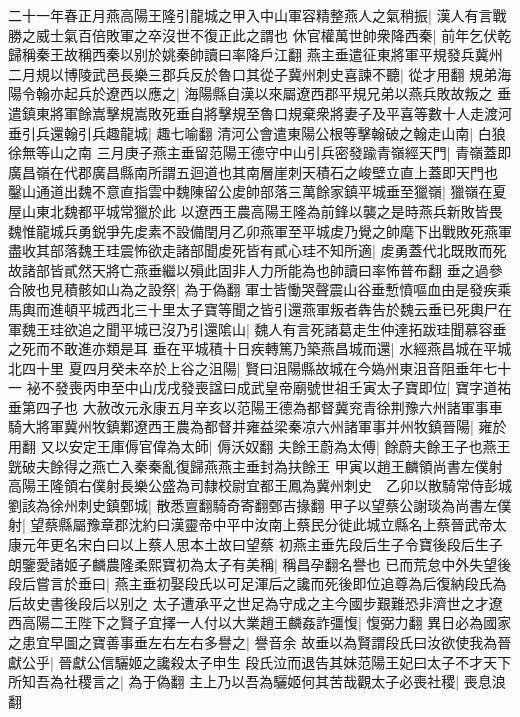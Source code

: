 二十一年春正月燕高陽王隆引龍城之甲入中山軍容精整燕人之氣稍振|{
	漢人有言戰勝之威士氣百倍敗軍之卒沒世不復正此之謂也}
休官權萬世帥衆降西秦|{
	前年乞伏乾歸稱秦王故稱西秦以别於姚秦帥讀曰率降戶江翻}
燕主垂遣征東將軍平規發兵冀州二月規以博陵武邑長樂三郡兵反於魯口其從子冀州刺史喜諫不聽|{
	從才用翻}
規弟海陽令翰亦起兵於遼西以應之|{
	海陽縣自漢以來屬遼西郡平規兄弟以燕兵敗故叛之}
垂遣鎮東將軍餘嵩擊規嵩敗死垂自將擊規至魯口規棄衆將妻子及平喜等數十人走渡河垂引兵還翰引兵趣龍城|{
	趣七喻翻}
清河公會遣東陽公根等擊翰破之翰走山南|{
	白狼徐無等山之南}
三月庚子燕主垂留范陽王德守中山引兵密發踰青嶺經天門|{
	青嶺蓋即廣昌嶺在代郡廣昌縣南所謂五迴道也其南層崖刺天積石之峻壁立直上蓋即天門也}
鑿山通道出魏不意直指雲中魏陳留公䖍帥部落三萬餘家鎮平城垂至獵嶺|{
	獵嶺在夏屋山東北魏都平城常獵於此}
以遼西王農高陽王隆為前鋒以襲之是時燕兵新敗皆畏魏惟龍城兵勇鋭爭先䖍素不設備閏月乙卯燕軍至平城䖍乃覺之帥麾下出戰敗死燕軍盡收其部落魏王珪震怖欲走諸部聞䖍死皆有貳心珪不知所適|{
	䖍勇蓋代北既敗而死故諸部皆貳然天將亡燕垂繼以殞此固非人力所能為也帥讀曰率怖普布翻}
垂之過參合陂也見積骸如山為之設祭|{
	為于偽翻}
軍士皆慟哭聲震山谷垂慙憤嘔血由是發疾乘馬輿而進頓平城西北三十里太子寶等聞之皆引還燕軍叛者犇告於魏云垂已死輿尸在軍魏王珪欲追之聞平城已沒乃引還隂山|{
	魏人有言死諸葛走生仲達拓跋珪聞慕容垂之死而不敢進亦類是耳}
垂在平城積十日疾轉篤乃築燕昌城而還|{
	水經燕昌城在平城北四十里}
夏四月癸未卒於上谷之沮陽|{
	賢曰沮陽縣故城在今媯州東沮音阻垂年七十一}
袐不發喪丙申至中山戊戌發喪諡曰成武皇帝廟號世祖壬寅太子寶即位|{
	寶字道祐垂第四子也}
大赦改元永康五月辛亥以范陽王德為都督冀兖青徐荆豫六州諸軍事車騎大將軍冀州牧鎮鄴遼西王農為都督并雍益梁秦凉六州諸軍事并州牧鎮晉陽|{
	雍於用翻}
又以安定王庫傉官偉為太師|{
	傉沃奴翻}
夫餘王蔚為太傅|{
	餘蔚夫餘王子也燕王皝破夫餘得之燕亡入秦秦亂復歸燕燕主垂封為扶餘王}
甲寅以趙王麟領尚書左僕射高陽王隆領右僕射長樂公盛為司隸校尉宜都王鳳為冀州刺史　乙卯以散騎常侍彭城劉該為徐州刺史鎮鄄城|{
	散悉亶翻騎奇寄翻鄄吉掾翻}
甲子以望蔡公謝琰為尚書左僕射|{
	望蔡縣屬豫章郡沈約曰漢靈帝中平中汝南上蔡民分徙此城立縣名上蔡晉武帝太康元年更名宋白曰以上蔡人思本土故曰望蔡}
初燕主垂先段后生子令寶後段后生子朗鑒愛諸姬子麟農隆柔熙寶初為太子有美稱|{
	稱昌孕翻名譽也}
已而荒怠中外失望後段后嘗言於垂曰|{
	燕主垂初娶段氏以可足渾后之讒而死後即位追尊為后復納段氏為后故史書後段后以别之}
太子遭承平之世足為守成之主今國步艱難恐非濟世之才遼西高陽二王陛下之賢子宜擇一人付以大業趙王麟姦詐彊愎|{
	愎弼力翻}
異日必為國家之患宜早圖之寶善事垂左右左右多譽之|{
	譽音余}
故垂以為賢謂段氏曰汝欲使我為晉獻公乎|{
	晉獻公信驪姬之讒殺太子申生}
段氏泣而退告其妹范陽王妃曰太子不才天下所知吾為社稷言之|{
	為于偽翻}
主上乃以吾為驪姬何其苦哉觀太子必喪社稷|{
	喪息浪翻}
